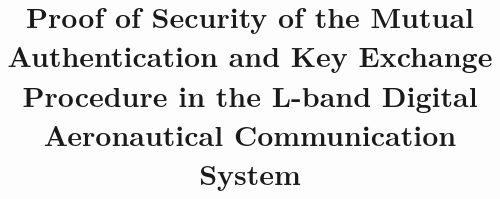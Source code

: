 \title{Proof of Security of the Mutual Authentication and Key Exchange Procedure in the L-band Digital Aeronautical Communication System}



\author{}

\institute{}

\maketitle